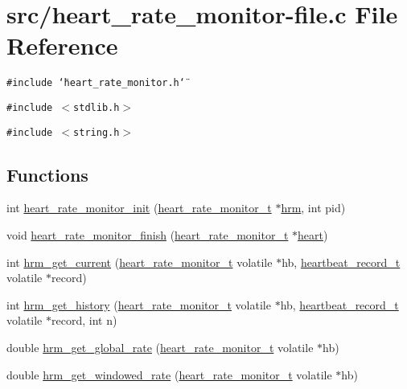 \hypertarget{heart__rate__monitor-file_8c}{
\section{src/heart\_\-rate\_\-monitor-file.c File Reference}
\label{heart__rate__monitor-file_8c}
}
{\tt \#include \char`\"{}heart\_\-rate\_\-monitor.h\char`\"{}}\par
{\tt \#include $<$stdlib.h$>$}\par
{\tt \#include $<$string.h$>$}\par
\subsection*{Functions}
\begin{CompactItemize}
\item 
int \hyperlink{heart__rate__monitor-file_8c_d49db9e81266e365b06d5c818d7e5b63}{heart\_\-rate\_\-monitor\_\-init} (\hyperlink{structheart__rate__monitor__t}{heart\_\-rate\_\-monitor\_\-t} $\ast$\hyperlink{lat_8c_f6999b2aa30c479bbb16f354ff38c1e5}{hrm}, int pid)
\item 
void \hyperlink{heart__rate__monitor-file_8c_070d042cdc3717897098cc6ac9682427}{heart\_\-rate\_\-monitor\_\-finish} (\hyperlink{structheart__rate__monitor__t}{heart\_\-rate\_\-monitor\_\-t} $\ast$\hyperlink{tp_8c_6f3bbe24b9b561560ce8bf9208aeb8a7}{heart})
\item 
int \hyperlink{heart__rate__monitor-file_8c_333f4dfca799e511a797559107dea290}{hrm\_\-get\_\-current} (\hyperlink{structheart__rate__monitor__t}{heart\_\-rate\_\-monitor\_\-t} volatile $\ast$hb, \hyperlink{structheartbeat__record__t}{heartbeat\_\-record\_\-t} volatile $\ast$record)
\item 
int \hyperlink{heart__rate__monitor-file_8c_9e7614bee97e7db3cb4e7e4b78c94337}{hrm\_\-get\_\-history} (\hyperlink{structheart__rate__monitor__t}{heart\_\-rate\_\-monitor\_\-t} volatile $\ast$hb, \hyperlink{structheartbeat__record__t}{heartbeat\_\-record\_\-t} volatile $\ast$record, int n)
\item 
double \hyperlink{heart__rate__monitor-file_8c_ddc73b92ee482b42aa7a91ea5fc3672c}{hrm\_\-get\_\-global\_\-rate} (\hyperlink{structheart__rate__monitor__t}{heart\_\-rate\_\-monitor\_\-t} volatile $\ast$hb)
\item 
double \hyperlink{heart__rate__monitor-file_8c_4fb2684671956dfa63ea54ce58ac8748}{hrm\_\-get\_\-windowed\_\-rate} (\hyperlink{structheart__rate__monitor__t}{heart\_\-rate\_\-monitor\_\-t} volatile $\ast$hb)

\end{CompactItemize}
